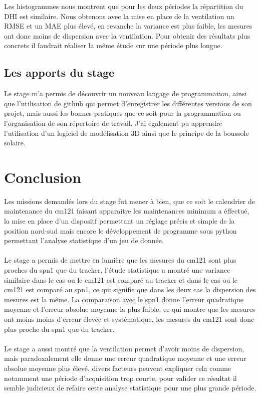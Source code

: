 \documentclass[12pt,a4paper]{article}
\begin{document}
\begin{flushleft}
Les histogrammes nous montrent que pour les deux périodes la répartition du DHI est similaire.
Nous obtenons avec la mise en place de la ventilation un RMSE et un MAE plus élevé, en revanche la variance est plus faible, les mesures ont donc moins de dispersion avec la ventilation. Pour obtenir des résultats plus concrets il faudrait réaliser la même étude sur une période plus longue.

\subsection{Les apports du stage}

Le stage m'a permis de découvrir un nouveau langage de programmation, ainsi que l'utilisation de github qui permet d'enregistrer les différentes versions de son projet, mais aussi les bonnes pratiques que ce soit pour la programmation ou l'organisation de son répertoire de travail. J'ai également pu apprendre l'utilisation d'un logiciel de modélisation 3D ainsi que le principe de la boussole solaire.


\section{Conclusion}

Les missions demandés lors du stage fut mener à bien, que ce soit le calendrier de maintenance du cm121 faisant apparaitre les maintenances minimum a éffectué, la mise en place d'un dispositf permettant un réglage précis et simple de la position nord-sud mais encore le développement de programme sous python permettant l'analyse statistique d'un jeu de donnée.\\
~\\
Le stage a permis de mettre en lumière que les mesures du cm121 sont plus proches du spn1 que du tracker, l'étude statistique a montré une variance similaire dans le cas ou le cm121 est comparé au tracker et dans le cas ou le cm121 est comparé au spn1, ce qui signifie que dans les deux cas la dispersion des mesures est la même. La comparaison avec le spn1 donne l'erreur quadratique  moyenne et l'erreur absolue moyenne la plus faible, ce qui montre que les mesures ont moins moins d'erreur élevée et systématique, les mesures du cm121 sont donc plus proche du spn1 que du tracker.\\
~\\
Le stage a aussi montré que la ventilation permet d'avoir moins de dispersion, mais paradoxalement elle donne une erreur quadratique moyenne et une erreur absolue moyenne plus élevé, divers facteurs peuvent expliquer cela comme notamment une période d'acquisition trop courte, pour valider ce résultat il semble judicieux de refaire cette analyse statistique pour une plus grande période.


\end{flushleft}
\end{document}
